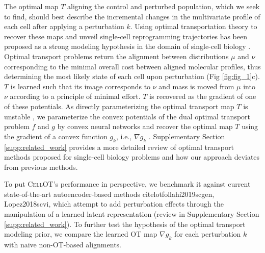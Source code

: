 The optimal map $T$ aligning the control and perturbed population, which we seek to find, should best describe the incremental changes in the multivariate profile of each cell after applying a perturbation $k$.
Using optimal transportation theory \cite{villani2021topics, santambrogio2015optimal} to recover these maps and unveil single-cell reprogramming trajectories has been proposed as a strong modeling hypothesis in the domain of single-cell biology \cite{schiebinger2019optimal, cang2020inferring, demetci2020gromov, huizing2021optimal, lavenant2021towards, zhang2021optimal}.
Optimal transport problems return the alignment between distributions $\mu$ and $\nu$ corresponding to the minimal overall cost between aligned molecular profiles, thus determining the most likely state of each cell upon perturbation (Fig \ref{fig:fig_1}c).
$T$ is learned such that its image corresponds to $\nu$ and mass is moved from $\mu$ into $\nu$ according to a principle of minimal effort.
$T$ is recovered as the gradient of one of these potentials.
As directly parameterizing the optimal transport map $T$ \cite{korotin2019wasserstein, yang2018scalable, prasad2020optimal} is unstable \citep[Table 1]{makkuva2020optimal}, we parameterize the convex potentials of the dual optimal transport problem $f$ and $g$ by convex neural networks \cite{amos2017input} and recover the optimal map $T$ using the gradient of a convex function $g_k$, i.e., $\nabla g_k$ \cite{makkuva2020optimal}.
Supplementary Section \ref{supp:related_work} provides a more detailed review of optimal transport methods proposed for single-cell biology problems and how our approach deviates from previous methods.

To put \textsc{CellOT}'s performance in perspective, we benchmark it against current state-of-the-art autoencoder-based methods cite{lotfollahi2019scgen, Lopez2018scvi},
which attempt to add perturbation effects through the manipulation of a learned latent representation (review in Supplementary Section \ref{supp:related_work}).
To further test the hypothesis of the optimal transport modeling prior, we compare the learned OT map $\nabla g_k$ for each perturbation $k$ with naive non-OT-based alignments.




